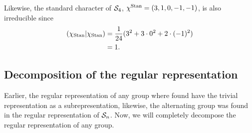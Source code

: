 \begin{example}[$\Sym_4$]
	Likewise, the standard character of $\Sym_4$, $\chi^{\text{Stan}} = (3,1,0,-1,-1)$, is also irreducible since 
	\begin{align*}
		(\chi_{\text{Stan}} \vert \chi_{\text{Stan}}) &= \frac{1}{24}(3^2 + 3\cdot 0^2 + 2 \cdot (-1)^2)  \\
		&= 1.
	\end{align*}
\end{example}

\subsection{Decomposition of the regular representation}

Earlier, the regular representation of any group where found have the trivial representation as a subrepresentation, likewise, the alternating group was found in the regular representation of $\mathcal{S}_n$. Now, we will completely decompose the regular representation of any group.

